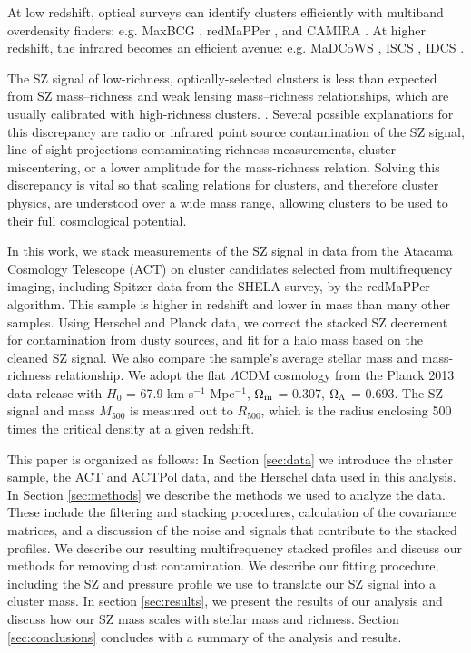 \documentclass[a4paper,fleqn,usenatbib]{mnras}
\begin{document}
At low redshift, optical surveys can identify clusters efficiently with multiband overdensity finders: e.g. MaxBCG \citep{2007ApJ...660..221K}, redMaPPer \citep{2014ApJ...785..104R}, and CAMIRA \citep{2014MNRAS.444..147O}.
At higher redshift, the infrared becomes an efficient avenue: e.g. MaDCoWS \citep{2014ApJS..213...25S}, ISCS 
\citep{2008ApJ...684..905E}, IDCS \citep{2012ApJ...753..164S}.

The SZ signal of low-richness, optically-selected clusters is less than expected from SZ mass--richness and weak lensing mass--richness relationships, which are usually calibrated with high-richness clusters.  \citep{2011A&A...536A..12P,2012PhRvD..85b3005D,2013ApJ...767...38S,2016arXiv160508770S}. Several possible explanations for this discrepancy are radio or infrared point source contamination of the SZ signal, line-of-sight projections contaminating richness measurements, cluster miscentering, or a lower amplitude for the mass-richness relation. Solving this discrepancy is vital so that scaling relations for clusters, and therefore cluster physics, are understood over a wide mass range, allowing clusters to be used to their full cosmological potential.

In this work, we stack measurements of the SZ signal in data from the Atacama Cosmology Telescope (ACT) on cluster candidates selected from multifrequency imaging, including Spitzer data from the SHELA survey, by the redMaPPer algorithm.  This sample is higher in redshift and lower in mass than many other samples. Using Herschel and Planck data, we correct the stacked SZ decrement for contamination from dusty sources, and fit for a halo mass based on the cleaned SZ signal. We also compare the sample's average stellar mass and mass-richness relationship.
We adopt the flat $\Lambda$CDM cosmology from the Planck 2013 data release \citep{2014A&A...571A..16P} with $H_{0}$ = 67.9 km s$^{-1}$ Mpc$^{-1}$, $\Omega_{\rm m}$ = 0.307, $\Omega_{\rm \Lambda}$ = 0.693. The SZ signal and mass $M_{500}$ is measured out to $R_{500}$, which is the radius enclosing 500 times the critical density at a given redshift.

This paper is organized as follows: In Section \ref{sec:data} we introduce the cluster sample, the ACT and ACTPol data, and the Herschel data used in this analysis. In Section \ref{sec:methods} we describe the methods we used to analyze the data. These include the filtering and stacking procedures, calculation of the covariance matrices, and a discussion of the noise and signals that contribute to the stacked profiles. We describe our resulting multifrequency stacked profiles 
and discuss our methods for removing dust contamination. We describe our fitting procedure, including the SZ and pressure profile we use to translate our SZ signal into a cluster mass. In section \ref{sec:results}, we present the results of our analysis and discuss how our SZ mass scales with stellar mass and richness. Section \ref{sec:conclusions} concludes with a summary of the analysis and results.
\end{document}
